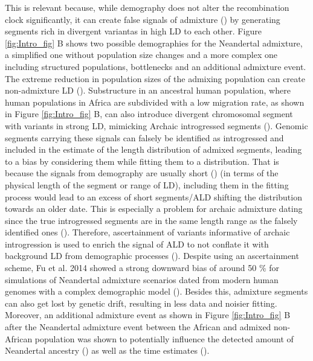 \documentclass[]{article}
\begin{document}
This is relevant because, while demography does not alter the
recombination clock significantly, it can create false signals of
admixture (\cite{vernot_resurrecting_2014,hsieh_whole-genome_2016}) by
generating segments rich in divergent variantas in high LD to each
other. Figure \ref{fig:Intro_fig} B shows two possible demographies for
the Neandertal admixture, a simplified one without population size
changes and a more complex one including structured populations,
bottlenecks and an additional admixture event. The extreme reduction in
population sizes of the admixing population can create non-admixture LD
(\cite{schaper_linkage_2012}). Substructure in an ancestral human
population, where human populations in Africa are subdivided with a low
migration rate, as shown in Figure \ref{fig:Intro_fig} B, can also
introduce divergent chromosomal segment with variants in strong LD,
mimicking Archaic introgressed segments
(\cite{nei_linkage_1973,pfaff_population_2001}). Genomic segments
carrying these signals can falsely be identified as introgressed and
included in the estimate of the length distribution of admixed segments,
leading to a bias by considering them while fitting them to a
distribution. That is because the signals from demography are usually
short (\cite{patterson_methods_2004,moorjani_history_2011}) (in terms of
the physical length of the segment or range of LD), including them in
the fitting process would lead to an excess of short segments/ALD
shifting the distribution towards an older date. This is especially a
problem for archaic admixture dating since the true introgressed
segments are in the same length range as the falsely identified ones
(\cite{sankararaman_date_2012}). Therefore, ascertainment of variants
informative of archaic introgression is used to enrich the signal of ALD
to not conflate it with background LD from demographic processes
(\cite{sankararaman_date_2012,fu_genome_2014,sankararaman_combined_2016,moorjani_genetic_2016}).
Despite using an ascertainment scheme, Fu et al. 2014 showed a strong
downward bias of around 50 \% for simulations of Neandertal admixture
scenarios dated from modern human genomes with a complex demographic
model (\cite{fu_genome_2014}). Besides this, admixture segments can also
get lost by genetic drift, resulting in less data and noisier fitting.
Moreover, an additional admixture event as shown in Figure
\ref{fig:Intro_fig} B after the Neandertal admixture event between the
African and admixed non-African population was shown to potentially
influence the detected amount of Neandertal ancestry
(\cite{petr_limits_2019}) as well as the time estimates
(\cite{sankararaman_date_2012}).
\end{document}
